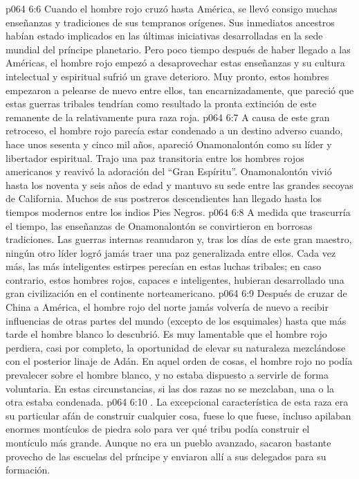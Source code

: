 \vs p064 6:6 Cuando el hombre rojo cruzó hasta América, se llevó consigo muchas enseñanzas y tradiciones de sus tempranos orígenes. Sus inmediatos ancestros habían estado implicados en las últimas iniciativas desarrolladas en la sede mundial del príncipe planetario. Pero poco tiempo después de haber llegado a las Américas, el hombre rojo empezó a desaprovechar estas enseñanzas y su cultura intelectual y espiritual sufrió un grave deterioro. Muy pronto, estos hombres empezaron a pelearse de nuevo entre ellos, tan encarnizadamente, que pareció que estas guerras tribales tendrían como resultado la pronta extinción de este remanente de la relativamente pura raza roja.
\vs p064 6:7 A causa de este gran retroceso, el hombre rojo parecía estar condenado a un destino adverso cuando, hace unos sesenta y cinco mil años, apareció Onamonalontón como su líder y libertador espiritual. Trajo una paz transitoria entre los hombres rojos americanos y reavivó la adoración del “Gran Espíritu”. Onamonalontón vivió hasta los noventa y seis años de edad y mantuvo su sede entre las grandes secoyas de California. Muchos de sus postreros descendientes han llegado hasta los tiempos modernos entre los indios Pies Negros.
\vs p064 6:8 A medida que trascurría el tiempo, las enseñanzas de Onamonalontón se convirtieron en borrosas tradiciones. Las guerras internas reanudaron y, tras los días de este gran maestro, ningún otro líder logró jamás traer una paz generalizada entre ellos. Cada vez más, las más inteligentes estirpes perecían en estas luchas tribales; en caso contrario, estos hombres rojos, capaces e inteligentes, hubieran desarrollado una gran civilización en el continente norteamericano.
\vs p064 6:9 Después de cruzar de China a América, el hombre rojo del norte jamás volvería de nuevo a recibir influencias de otras partes del mundo (excepto de los esquimales) hasta que más tarde el hombre blanco lo descubrió. Es muy lamentable que el hombre rojo perdiera, casi por completo, la oportunidad de elevar su naturaleza mezclándose con el posterior linaje de Adán. En aquel orden de cosas, el hombre rojo no podía prevalecer sobre el hombre blanco, y no estaba dispuesto a servirle de forma voluntaria. En estas circunstancias, si las dos razas no se mezclaban, una o la otra estaba condenada.
\vs p064 6:10 . La excepcional característica de esta raza era su particular afán de construir cualquier cosa, fuese lo que fuese, incluso apilaban enormes montículos de piedra solo para ver qué tribu podía construir el montículo más grande. Aunque no era un pueblo avanzado, sacaron bastante provecho de las escuelas del príncipe y enviaron allí a sus delegados para su formación.
